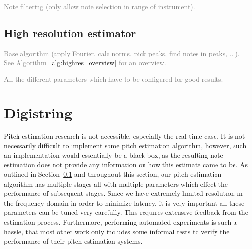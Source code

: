 \documentclass[a4paper,10pt,twocolumn]{article}
\begin{document}
\textcolor{gray}{Note filtering (only allow note selection in range of instrument).}


\subsection{High resolution estimator}  \label{sec:highrespitch}
\textcolor{gray}{Base algorithm (apply Fourier, calc norms, pick peaks, find notes in peaks, ...). See Algorithm~\ref{alg:highres_overview} for an overview.}

\textcolor{gray}{All the different parameters which have to be configured for good results.}







\section{Digistring}
%
Pitch estimation research is not accessible, especially the real-time case. It is not necessarily difficult to implement some pitch estimation algorithm, however, such an implementation would essentially be a black box, as the resulting note estimation does not provide any information on how this estimate came to be. As outlined in Section~\ref{sec:highrespitch} and throughout this section, our pitch estimation algorithm has multiple stages all with multiple parameters which effect the performance of subsequent stages. Since we have extremely limited resolution in the frequency domain in order to minimize latency, it is very important all these parameters can be tuned very carefully. This requires extensive feedback from the estimation process. Furthermore, performing automated experiments is such a hassle, that most other work only includes some informal tests to verify the performance of their pitch estimation systems.
\end{document}

